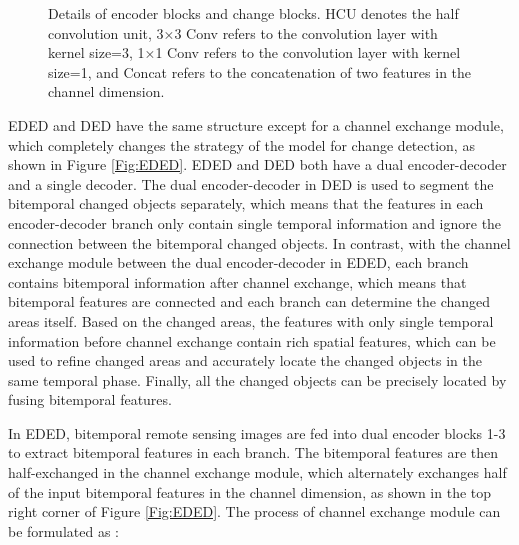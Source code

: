\documentclass[journal]{IEEEtran}
\begin{document}
\begin{figure}[!ht]
 \centering
 \caption{Details of encoder blocks and change blocks. HCU denotes the half convolution unit, 3×3 Conv refers to the convolution layer with kernel size=3, 1×1 Conv refers to the convolution layer with kernel size=1, and Concat refers to the concatenation of two features in the channel dimension.}
 \label{Fig:blocks}
\end{figure}

EDED and DED have the same structure except for a channel exchange module, which completely changes the strategy of the model for change detection, as shown in Figure \ref{Fig:EDED}. EDED and DED both have a dual encoder-decoder and a single decoder. The dual encoder-decoder in DED is used to segment the bitemporal changed objects separately, which means that the features in each encoder-decoder branch only contain single temporal information and ignore the connection between the bitemporal changed objects. In contrast, with the channel exchange module between the dual encoder-decoder in EDED, each branch contains bitemporal information after channel exchange, which means that bitemporal features are connected and each branch can determine the changed areas itself. Based on the changed areas, the features with only single temporal information before channel exchange contain rich spatial features, which can be used to refine changed areas and accurately locate the changed objects in the same temporal phase. Finally, all the changed objects can be precisely located by fusing bitemporal features. 

In EDED, bitemporal remote sensing images are fed into dual encoder blocks 1-3 to extract bitemporal features in each branch. The bitemporal features are then half-exchanged in the channel exchange module, which alternately exchanges half of the input bitemporal features in the channel dimension, as shown in the top right corner of Figure \ref{Fig:EDED}. The process of channel exchange module can be formulated as :
\end{document}
